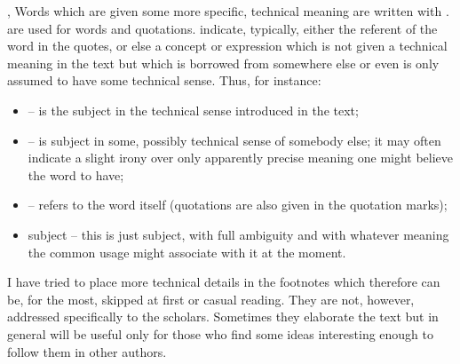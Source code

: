 \sep
Words which are given some more specific, technical meaning are 
written with .  are used for 
words and quotations.  indicate, 
typically, either the referent of the word in the quotes, or else a 
concept or expression which is not given a technical meaning in the 
text but which is borrowed from somewhere else or even is only 
assumed to have some technical sense. Thus, for instance:
\begin{itemize}
\item 
{} -- is the subject in the technical sense introduced in
the text;
\item 
{} -- is subject in some, possibly technical sense of
somebody else; it may often indicate a slight irony over only apparently
precise meaning one might believe the word  to have;
\item 
{} -- refers to the word itself (quotations are also given
in the quotation marks);
\item 
subject -- this is just subject, with full ambiguity and with whatever meaning
the common usage might associate with it at the moment. 
\end{itemize}
I have tried to place more technical details in the footnotes which therefore
can be, for the most, skipped at first or casual reading. They are not, however,
addressed specifically to the scholars. Sometimes they elaborate the text but in
general will be useful only for those 
 who find some ideas interesting enough to follow them in other
authors.

